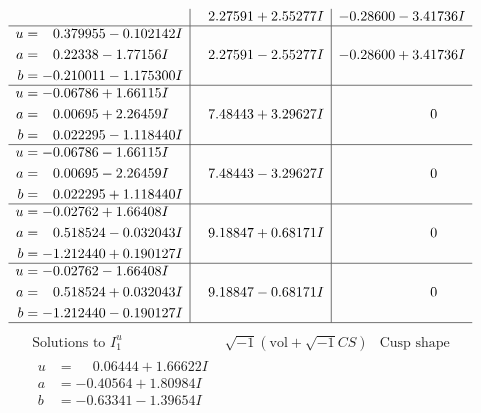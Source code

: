 \documentclass[1p]{elsarticle_modified}
\theoremstyle{definition}
\newcommand{\I}{\sqrt{-1}}
\begin{document}
$$\begin{array}{c|c|c}
 & \phantom{-}2.27591 + 2.55277 I & -0.28600 - 3.41736 I \\ \hline\begin{aligned}
u &= \phantom{-}0.379955 - 0.102142 I \\
a &= \phantom{-}0.22338 - 1.77156 I \\
b &= -0.210011 - 1.175300 I\end{aligned}
 & \phantom{-}2.27591 - 2.55277 I & -0.28600 + 3.41736 I \\ \hline\begin{aligned}
u &= -0.06786 + 1.66115 I \\
a &= \phantom{-}0.00695 + 2.26459 I \\
b &= \phantom{-}0.022295 - 1.118440 I\end{aligned}
 & \phantom{-}7.48443 + 3.29627 I & \phantom{-0.000000 } 0 \\ \hline\begin{aligned}
u &= -0.06786 - 1.66115 I \\
a &= \phantom{-}0.00695 - 2.26459 I \\
b &= \phantom{-}0.022295 + 1.118440 I\end{aligned}
 & \phantom{-}7.48443 - 3.29627 I & \phantom{-0.000000 } 0 \\ \hline\begin{aligned}
u &= -0.02762 + 1.66408 I \\
a &= \phantom{-}0.518524 - 0.032043 I \\
b &= -1.212440 + 0.190127 I\end{aligned}
 & \phantom{-}9.18847 + 0.68171 I & \phantom{-0.000000 } 0 \\ \hline\begin{aligned}
u &= -0.02762 - 1.66408 I \\
a &= \phantom{-}0.518524 + 0.032043 I \\
b &= -1.212440 - 0.190127 I\end{aligned}
 & \phantom{-}9.18847 - 0.68171 I & \phantom{-0.000000 } 0\\
 \hline 
 \end{array}$$\newpage$$\begin{array}{c|c|c}  
\text{Solutions to }I^u_{1}& \I (\text{vol} + \sqrt{-1}CS) & \text{Cusp shape}\\
 \hline 
\begin{aligned}
u &= \phantom{-}0.06444 + 1.66622 I \\
a &= -0.40564 + 1.80984 I \\
b &= -0.63341 - 1.39654 I\end{aligned}

\end{array}$$
\end{document}
